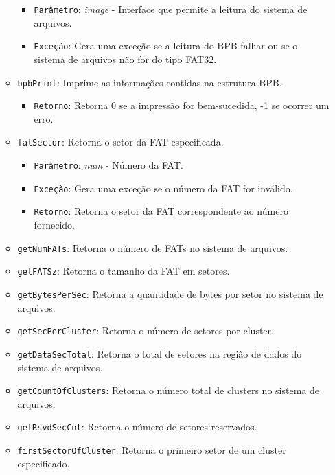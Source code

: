 \documentclass[
    12pt,				%
    oneside,   	        %
    a4paper,			%
    english,			%
    french,				%
    spanish,			%
    brazil,				%
    ]{pacotes/abntex2}
\begin{document}
\begin{itemize}
\begin{itemize}
            \begin{itemize}
                \item \texttt{Parâmetro}: \textit{image} - Interface que permite a leitura do sistema de arquivos.
                \item \texttt{Exceção}: Gera uma exceção se a leitura do BPB falhar ou se o sistema de arquivos não for do tipo FAT32.
            \end{itemize}
            \item \texttt{bpbPrint}: Imprime as informações contidas na estrutura BPB.
            \begin{itemize}
                \item \texttt{Retorno}: Retorna 0 se a impressão for bem-sucedida, -1 se ocorrer um erro.
            \end{itemize}
            \item \texttt{fatSector}: Retorna o setor da FAT especificada.
            \begin{itemize}
                \item \texttt{Parâmetro}: \textit{num} - Número da FAT.
                \item \texttt{Exceção}: Gera uma exceção se o número da FAT for inválido.
                \item \texttt{Retorno}: Retorna o setor da FAT correspondente ao número fornecido.
            \end{itemize}
            \item \texttt{getNumFATs}: Retorna o número de FATs no sistema de arquivos.
            \item \texttt{getFATSz}: Retorna o tamanho da FAT em setores.
            \item \texttt{getBytesPerSec}: Retorna a quantidade de bytes por setor no sistema de arquivos.
            \item \texttt{getSecPerCluster}: Retorna o número de setores por cluster.
            \item \texttt{getDataSecTotal}: Retorna o total de setores na região de dados do sistema de arquivos.
            \item \texttt{getCountOfClusters}: Retorna o número total de clusters no sistema de arquivos.
            \item \texttt{getRsvdSecCnt}: Retorna o número de setores reservados.
            \item \texttt{firstSectorOfCluster}: Retorna o primeiro setor de um cluster especificado.
            \begin{itemize}

\end{itemize}
\end{itemize}
\end{itemize}
\end{document}
